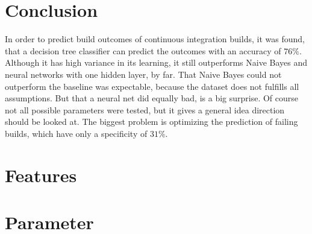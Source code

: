 \documentclass[a4paper,11pt]{article}
\begin{document}
\section{Conclusion}	

In order to predict build outcomes of continuous integration builds, it was found, that a decision tree classifier can predict the outcomes with an accuracy of $76\%$. Although it has high variance in its learning, it still outperforms Naive Bayes and neural networks with one hidden layer, by far. That Naive Bayes could not outperform the baseline was expectable, because the dataset does not fulfills all assumptions. But that a neural net did equally bad, is a big surprise. Of course not all possible parameters were tested, but it gives a general idea direction should be looked at. The biggest problem is optimizing the prediction of failing builds, which have only a specificity of $31\%$. 





\appendix

\section{Features}



\section{Parameter}



\end{document}
